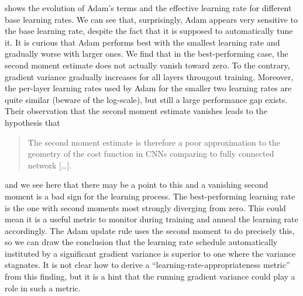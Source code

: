  shows the evolution of Adam's terms and the effective
learning rate for different base learning rates. We can see that, surprisingly,
Adam appears very sensitive to the base learning rate, despite the fact that it
is supposed to automatically tune it. It is curious that Adam performs best with
the smallest learning rate and gradually worse with larger ones. We find that in
the best-performing case, the second moment estimate does not actually vanish
toward zero. To the contrary, gradient variance gradually increases for all
layers througout training. Moreover, the per-layer learning rates used by Adam
for the smaller two learning rates are quite similar (beware of the log-scale), but still a large
performance gap exists. Their observation that the second moment estimate
vanishes leads \citeauthor{kingma2014adam} to the hypothesis that
\begin{quote}
     The second moment estimate is therefore a poor
     approximation to the geometry of the cost function in CNNs comparing to
     fully connected network [\ldots].
\end{quote}
and we see here that there may be a point to this and a vanishing second moment
is a bad sign for the learning process. The best-performing learning rate is the
one with second moments most strongly diverging from zero. This could mean it is
a useful metric to monitor during training and anneal the learning rate
accordingly. The Adam update rule uses the second moment to do precisely this,
so we can draw the conclusion that the learning rate schedule automatically
instituted by a significant gradient variance is superior to one where the
variance stagnates. It is not clear how to derive a
``learning-rate-appropriateness metric'' from this finding, but it is a hint
that the running gradient variance could play a role in such a metric.

